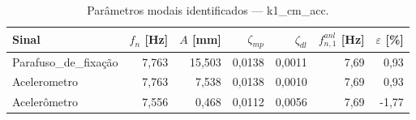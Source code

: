 \begin{table}[htbp]
  \centering
  \caption{Parâmetros modais identificados — k1\_cm\_acc.}
  \label{tab:modal_k1_cm_acc}
  \begin{tabular}{lrrrrrr}
    \toprule
    Sinal & $f_n$ [Hz] & $A$ [mm] & $\zeta_{mp}$ & $\zeta_{dl}$ & $f_{n,1}^{anl}$ [Hz] & $\varepsilon$ [\%] \\
    \midrule
    Parafuso\_de\_fixação & 7{,}763 & 15{,}503 & 0{,}0138 & 0{,}0011 & 7{,}69 & 0{,}93 \\
    Acelerometro & 7{,}763 & 7{,}538 & 0{,}0138 & 0{,}0010 & 7{,}69 & 0{,}93 \\
    Acelerômetro & 7{,}556 & 0{,}468 & 0{,}0112 & 0{,}0056 & 7{,}69 & -1{,}77 \\
    \bottomrule
  \end{tabular}
\end{table}
